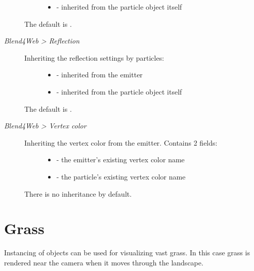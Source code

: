 \documentclass[a4paper,12pt,oneside]{sphinxmanual}
\begin{document}
\begin{description}
\begin{description}
\begin{itemize}
\item {} 
 - inherited from the particle object itself

\end{itemize}

\end{description}

The default is .

\item[{\emph{Blend4Web \textgreater{} Reflection}}] \leavevmode\begin{description}
\item[{Inheriting the reflection settings by particles:}] \leavevmode\begin{itemize}
\item {} 
 - inherited from the emitter

\item {} 
 - inherited from the particle object itself

\end{itemize}

\end{description}

The default is .

\item[{\emph{Blend4Web \textgreater{} Vertex color}}] \leavevmode\begin{description}
\item[{Inheriting the vertex color from the emitter. Contains 2 fields:}] \leavevmode\begin{itemize}
\item {} 
 - the emitter's existing vertex color name

\item {} 
 - the particle's existing vertex color name

\end{itemize}

\end{description}

There is no inheritance by default.

\end{description}


\section{Grass}
\label{particles_instancing:id3}\label{particles_instancing:particles-grass}
Instancing of objects can be used for visualizing vast grass. In this case grass is rendered near the camera when it moves through the landscape.
\end{document}
